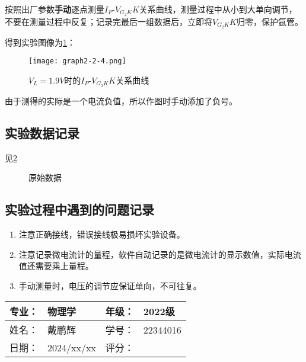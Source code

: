\documentclass[dvipsnames, svgnames,a4paper,11pt]{article}
\begin{document}
		按照出厂参数\textbf{手动}逐点测量$I_P$-$V_{G_2K}K$关系曲线，测量过程中从小到大单向调节，不要在测量过程中反复；记录完最后一组数据后，立即将$V_{G_2K}K$归零，保护氩管。

		得到实验图像为\cref{fig:graph2-2-4}：

		\begin{figure}[htbp]
			\centering
			\texttt{[image: graph2-2-4.png]}
			\caption{$V_L=1.9V$时的$I_P$-$V_{G_2K}K$关系曲线}
			\label{fig:graph2-2-4}
		\end{figure}


		由于测得的实际是一个电流负值，所以作图时手动添加了负号。



\subsection{实验数据记录}

	见\cref{fig:data}

	\begin{figure}[htbp]
		\centering
		\quad
		\quad


		\caption{原始数据}
		\label{fig:data}
	\end{figure}






\subsection{实验过程中遇到的问题记录}

\begin{enumerate}
	\item 注意正确接线，错误接线极易损坏实验设备。
	\item 注意记录微电流计的量程，软件自动记录的是微电流计的显示数值，实际电流值还需要乘上量程。
	\item 手动测量时，电压的调节应保证单向，不可往复。
	
\end{enumerate}
	

\clearpage
\begin{table}
	\renewcommand\arraystretch{1.7}
	\begin{tabularx}{\textwidth}{|X|X|X|X|}
	\hline
	专业：& 物理学 &年级：& 2022级\\
	\hline
	姓名： & 戴鹏辉 & 学号：& 22344016\\
	\hline
    日期：& 2024/xx/xx & 评分： &\\
	\hline
	\end{tabularx}
\end{table}
\end{document}
